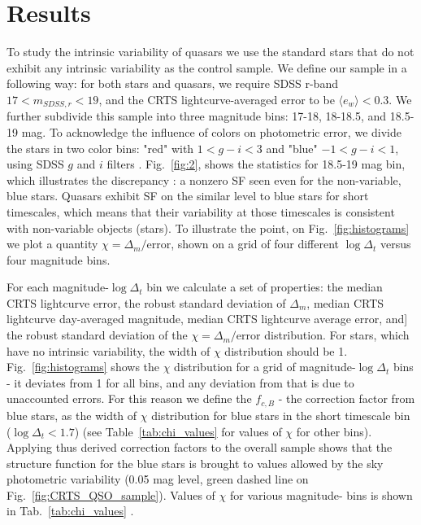 \documentclass[fleqn,usenatbib]{mnras}  %
\begin{document}
\section{Results}
\label{sec:err_analysis}
To study  the intrinsic variability of quasars we use the standard stars that do not exhibit any intrinsic variability as the control sample. We define our sample in a following way: for both stars and quasars, we require SDSS  r-band $17< m_{SDSS,r} < 19$, and the CRTS lightcurve-averaged error  to be   $ \langle e_{w}\rangle  < 0.3$.  We further subdivide this sample into three magnitude bins: 17-18, 18-18.5, and 18.5-19 mag.   To acknowledge the influence of colors on photometric error,  we divide the stars in two color bins: "red" with   $1 < g-i < 3$ and "blue" $-1 < g-i < 1$,  using SDSS $g$ and $i$ filters .  Fig.~\ref{fig:2}, shows the statistics for 18.5-19 mag bin, which illustrates the discrepancy : a nonzero SF seen even for the non-variable, blue stars. Quasars exhibit  SF on the similar level to blue stars for short timescales, which means that their variability at those timescales is consistent with non-variable objects (stars). To illustrate the point, on Fig.~\ref{fig:histograms} we plot a quantity $\chi = \Delta_{m}/ \mathrm{error}$, shown on a grid of four different $\log{\Delta_{t}}$ versus four  magnitude bins.  

For each magnitude-$\log{\Delta_{t}}$   bin we calculate a set of properties: the  median CRTS lightcurve error, the robust standard deviation of $\Delta_{m}$,    median CRTS lightcurve day-averaged magnitude, median CRTS lightcurve average error, and]   the robust standard deviation of  the $\chi = \Delta_{m}/ \mathrm{error}$  distribution. For stars, which have no intrinsic variability, the width of $\chi$ distribution should be 1.  Fig.~\ref{fig:histograms}  shows the $\chi$ distribution for a grid of magnitude-$\log{\Delta_{t}}$ bins - it deviates from 1 for all bins, and any deviation from that is due to unaccounted errors. For this reason we define the $ f_{c,B}$ - the correction factor from blue stars, as the width of $\chi$ distribution for blue stars in the short timescale bin ($\log{\Delta_{t}} < 1.7$) (see Table~\ref{tab:chi_values} for values of $\chi$ for other bins). Applying thus derived correction factors to the overall sample shows that the structure function for the blue stars is brought to values allowed by the sky photometric variability (0.05 mag level, green dashed line on Fig.~\ref{fig:CRTS_QSO_sample}). Values of $\chi$ for various magnitude-  bins is shown in Tab.~\ref{tab:chi_values} . 
\end{document}
